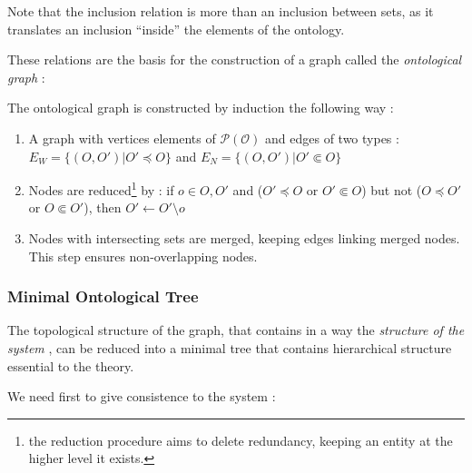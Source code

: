 Note that the inclusion relation is more than an inclusion between sets, as it translates an inclusion ``inside'' the elements of the ontology.

These relations are the basis for the construction of a graph called the \emph{ontological graph} :

\begin{definition}
The {ontological graph} is constructed by induction the following way :
\begin{enumerate}
\item A graph with vertices elements of $\mathcal{P(O)}$ and edges of two types : $E_W = \{(O,O') | O' \preccurlyeq O \}$ and $E_N = \{(O,O') | O' \Subset O \}$
\item Nodes are reduced\footnote{the reduction procedure aims to delete redundancy, keeping an entity at the higher level it exists.} by : if $o \in O,O'$ and ($O' \preccurlyeq O$ or $O' \Subset O$) but not ($O \preccurlyeq O'$ or $O \Subset O'$), then $O' \leftarrow O' \setminus o$
\item Nodes with intersecting sets are merged, keeping edges linking merged nodes. This step ensures non-overlapping nodes.
\end{enumerate}
\end{definition}





\subsubsection*{Minimal Ontological Tree}


The topological structure of the graph, that contains in a way the \emph{structure of the system}%
, can be reduced into a minimal tree that contains hierarchical structure essential to the theory.

We need first to give consistence to the system :

